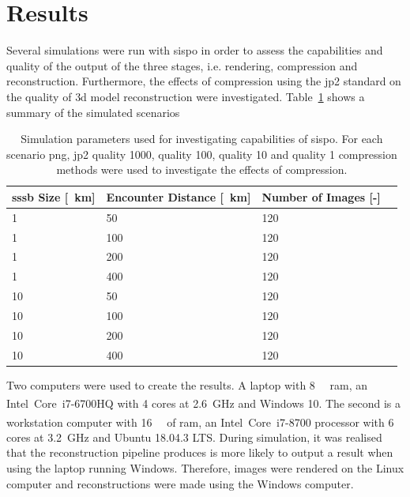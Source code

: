 \section{Results} \label{sec:results}
Several simulations were run with \gls{sispo} in order to assess the capabilities and quality of the output of the three stages, i.e. rendering, compression and reconstruction. Furthermore, the effects of compression using the \gls{jp2} standard on the quality of \gls{3d} model reconstruction were investigated. Table~\ref{tab:sim_params} shows a summary of the simulated scenarios

\begin{table}[htb]
    \centering
    \caption{Simulation parameters used for investigating capabilities of \gls{sispo}. For each scenario \gls{png}, \gls{jp2} quality 1000, quality 100, quality 10 and quality 1 compression methods were used to investigate the effects of compression.}
    \label{tab:sim_params}
    \begin{tabular}{l|lll}
        \textbf{\gls{sssb} Size [\SI{}{\kilo\meter}]}& \textbf{Encounter Distance [\SI{}{\kilo\meter}]} & \textbf{Number of Images [-]} \\ \hline
        1  & 50  & 120\\
        1  & 100 & 120\\
        1  & 200 & 120\\
        1  & 400 & 120\\
        10 & 50  & 120\\
        10 & 100 & 120\\
        10 & 200 & 120\\
        10 & 400 & 120\\
    \end{tabular}
\end{table}

Two computers were used to create the results. A laptop with \SI{8}{\giga\byte} \gls{ram}, an Intel\textsuperscript{\textregistered}~Core\texttrademark~i7-6700HQ with \SI{4}{} cores at \SI{2.6}{\giga\hertz} and Windows 10. The second is a workstation computer with \SI{16}{\giga\byte} of \gls{ram}, an Intel\textsuperscript{\textregistered}~Core\texttrademark~i7-8700 processor with \SI{6}{} cores at \SI{3.2}{\giga\hertz} and Ubuntu 18.04.3 LTS.
During simulation, it was realised that the reconstruction pipeline produces is more likely to output a result when using the laptop running Windows. Therefore, images were rendered on the Linux computer and reconstructions were made using the Windows computer.

